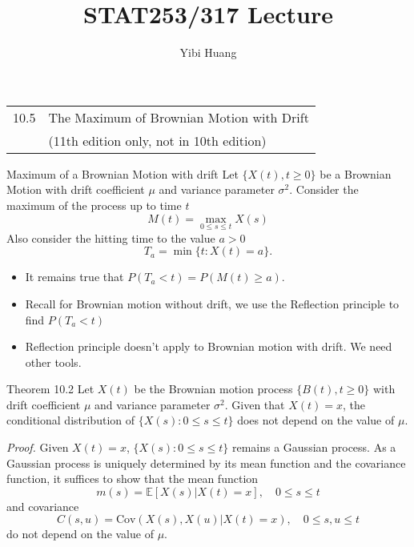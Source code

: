 \documentclass[letterpaper,handout]{beamer}
\title{STAT253/317 Lecture \chapnum} \date{} \author{Yibi Huang}
\def\E{\mathbb E}
\def\CV{\mathrm{Cov}}
\begin{document}
\begin{frame}\maketitle
\bigskip
\begin{center}\large
\begin{tabular}{ll}
10.5 & The Maximum of Brownian Motion with Drift\\
     & (11th edition only, not in 10th edition)
\end{tabular}
\end{center}
\end{frame}
\begin{frame}{Maximum of a Brownian Motion with drift}
Let $\{X(t),t\ge 0\}$ be a Brownian Motion with drift coefficient $\mu$ and variance parameter $\sigma^2$.
Consider the maximum of the process up to time $t$
\[M(t)=\max_{0\le s\le t} X(s)\]
Also consider the hitting time to the value $a>0$
\[
T_a=\min\{t: X(t)=a\}.
\]

\vspace{-6pt}\begin{itemize}
\item It remains true that $P(T_a<t)=P(M(t)\ge a).$
\item Recall for Brownian motion without drift, we use the Reflection principle to find $P(T_a<t)$
\item Reflection principle doesn't apply to Brownian motion with drift.
We need other tools.
\end{itemize}
\end{frame}
\begin{frame}{Theorem 10.2}
Let $X(t)$ be the Brownian motion process $\{B(t), t \ge 0\}$ with drift coefficient $\mu$ and variance
parameter $\sigma^2$.
Given that $X(t) = x$, the conditional distribution of
$\{X(s): 0 \le s \le t\}$ does not depend on the value of $\mu.$\medskip

{\it Proof.}
Given $X(t) = x$, $\{X(s): 0 \le s \le t\}$ remains a Gaussian process.
As a Gaussian process is uniquely determined by its mean function and the covariance function,
it suffices to show that the mean function
\[
m(s)=\E[X(s)|X(t)=x], \quad 0 \le s \le t
\]
and covariance
\[
C(s,u)=\CV(X(s),X(u)|X(t)=x), \quad 0 \le s,u \le t
\]
do not depend on the value of $\mu$.
\end{frame}
\end{document}
